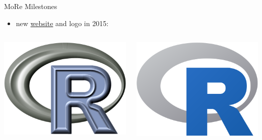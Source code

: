 \documentclass[t,12pt]{beamer}
\begin{document}

\begin{frame}{MoRe Milestones}

\begin{itemize}
   \item new \href{https://www.r-project.org/}{website} and logo in 2015:
\end{itemize}

\begin{columns}


\begin{center}
\includegraphics[scale=0.43]{rlogo_old.png}
\end{center}


\begin{center}
\includegraphics[scale=0.10]{rlogo_new.png}
\end{center}


\end{columns}
\end{frame}
\end{document}
